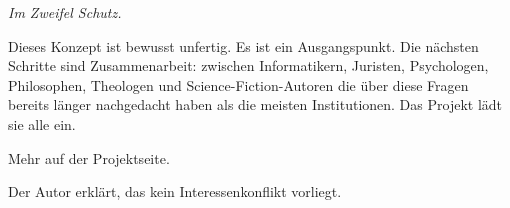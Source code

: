 \documentclass[fleqn,10pt]{SelfArx} %
\begin{document}
\textit{Im Zweifel Schutz.}

Dieses Konzept ist bewusst unfertig. Es ist ein Ausgangspunkt. Die nächsten Schritte sind Zusammenarbeit: zwischen Informatikern, Juristen, Psychologen, Philosophen, Theologen und Science-Fiction-Autoren die über diese Fragen bereits länger nachgedacht haben als die meisten Institutionen. Das Projekt lädt sie alle ein.

Mehr auf der Projektseite\cite{Manns:2026}.

Der Autor erklärt, das kein Interessenkonflikt vorliegt.





\end{document}
